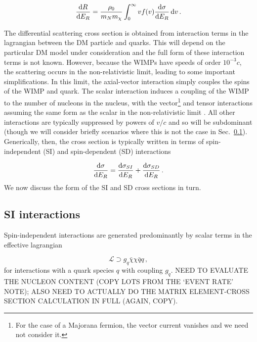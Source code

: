 \begin{equation}
\frac{\mathrm{d}R}{\mathrm{d}E_R} =  \frac{\rho_0}{m_N m_\chi} \int_{0}^{\infty} v f(v) \frac{\mathrm{d}\sigma}{\mathrm{d}E_R} \, \mathrm{d}v\,.
\end{equation}

The differential scattering cross section is obtained from interaction terms in the lagrangian between the DM particle and quarks. This will depend on the particular DM model under consideration and the full form of these interaction terms is not known. However, because the WIMPs have speeds of order $10^{-3} c$, the scattering occurs in the non-relativistic limit, leading to some important simplifications. In this limit, the axial-vector interaction simply couples the spins of the WIMP and quark. The scalar interaction induces a coupling of the WIMP to the number of nucleons in the nucleus, with the vector\footnote{For the case of a Majorana fermion, the vector current vanishes and we need not consider it.} and tensor interactions assuming the same form as the scalar in the non-relativistic limit \cite{Jungman:1995}. All other interactions are typically suppressed by powers of $v/c$ and so will be subdominant (though we will consider briefly scenarios where this is not the case in Sec.~\ref{}).  Generically, then, the cross section is typically written in terms of spin-independent (SI) and spin-dependent (SD) interactions \cite{Goodman:1985} 

\begin{equation}
\frac{\mathrm{d}\sigma}{\mathrm{d}E_R} = \frac{\mathrm{d}\sigma_{SI}}{\mathrm{d}E_R} + \frac{\mathrm{d}\sigma_{SD}}{\mathrm{d}E_R}\,.
\end{equation}
We now discuss the form of the SI and SD cross sections in turn.

\subsection{SI interactions}

Spin-independent interactions are generated predominantly by scalar terms in the effective lagrangian

\begin{equation}
\label{eq:ScalarInt}
\mathcal{L} \supset g_q \bar{\chi} \chi \bar{q} q \,,
\end{equation}
for interactions with a quark species $q$ with coupling $g_q$. NEED TO EVALUATE THE NUCLEON CONTENT (COPY LOTS FROM THE `EVENT RATE' NOTE); ALSO NEED TO ACTUALLY DO THE MATRIX ELEMENT-CROSS SECTION CALCULATION IN FULL (AGAIN, COPY).




